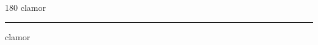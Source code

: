
\begin{frame}
\begin{center}
\begin{turn}{180}
{\fontsize{2.5cm}{1em}\selectfont clamor}
\end{turn}
\vspace{1em}\par  
\hrule
\vspace{1em}\par  
{\fontsize{2.5cm}{1em}\selectfont clamor}
\end{center}
\end{frame}

